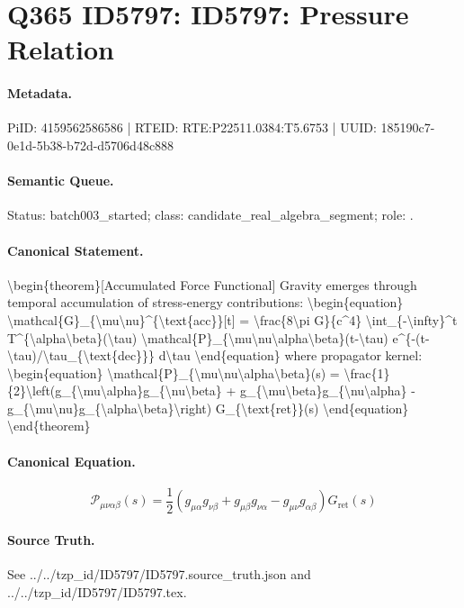 \section*{Q365 ID5797: ID5797: Pressure Relation}
\paragraph{Metadata.}
PiID: 4159562586586 | RTEID: RTE:P22511.0384:T5.6753 | UUID: 185190c7-0e1d-5b38-b72d-d5706d48c888

\paragraph{Semantic Queue.}
Status: batch003\_started; class: candidate\_real\_algebra\_segment; role: .

\paragraph{Canonical Statement.}
\textbackslash{}begin\{theorem\}[Accumulated Force Functional] Gravity emerges through temporal accumulation of stress-energy contributions: \textbackslash{}begin\{equation\} \textbackslash{}mathcal\{G\}\_\{\textbackslash{}mu\textbackslash{}nu\}\textasciicircum{}\{\textbackslash{}text\{acc\}\}[t] = \textbackslash{}frac\{8\textbackslash{}pi G\}\{c\textasciicircum{}4\} \textbackslash{}int\_\{-\textbackslash{}infty\}\textasciicircum{}t T\textasciicircum{}\{\textbackslash{}alpha\textbackslash{}beta\}(\textbackslash{}tau) \textbackslash{}mathcal\{P\}\_\{\textbackslash{}mu\textbackslash{}nu\textbackslash{}alpha\textbackslash{}beta\}(t-\textbackslash{}tau) e\textasciicircum{}\{-(t-\textbackslash{}tau)/\textbackslash{}tau\_\{\textbackslash{}text\{dec\}\}\} d\textbackslash{}tau \textbackslash{}end\{equation\} where propagator kernel: \textbackslash{}begin\{equation\} \textbackslash{}mathcal\{P\}\_\{\textbackslash{}mu\textbackslash{}nu\textbackslash{}alpha\textbackslash{}beta\}(s) = \textbackslash{}frac\{1\}\{2\}\textbackslash{}left(g\_\{\textbackslash{}mu\textbackslash{}alpha\}g\_\{\textbackslash{}nu\textbackslash{}beta\} + g\_\{\textbackslash{}mu\textbackslash{}beta\}g\_\{\textbackslash{}nu\textbackslash{}alpha\} - g\_\{\textbackslash{}mu\textbackslash{}nu\}g\_\{\textbackslash{}alpha\textbackslash{}beta\}\textbackslash{}right) G\_\{\textbackslash{}text\{ret\}\}(s) \textbackslash{}end\{equation\} \textbackslash{}end\{theorem\}

\paragraph{Canonical Equation.}
\[
\begin{equation} \mathcal{P}_{\mu\nu\alpha\beta}(s) = \frac{1}{2}\left(g_{\mu\alpha}g_{\nu\beta} + g_{\mu\beta}g_{\nu\alpha} - g_{\mu\nu}g_{\alpha\beta}\right) G_{\text{ret}}(s) \end{equation}
\]

\paragraph{Source Truth.}
See ../../tzp\_id/ID5797/ID5797.source\_truth.json and ../../tzp\_id/ID5797/ID5797.tex.
